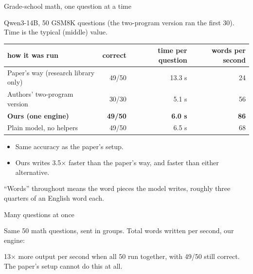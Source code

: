 \documentclass[aspectratio=169]{beamer}
\begin{document}
\begin{frame}{Grade-school math, one question at a time}

Qwen3-14B, 50 GSM8K questions (the two-program version ran the first 30). Time is the typical (middle) value.

\begin{center}
\begin{tabular}{lrrr}
\toprule
how it was run & correct & time per question & words per second \\
\midrule
Paper's way (research library only) & 49/50 & 13.3 s & 24 \\
Authors' two-program version & 30/30 & 5.1 s & 56 \\
\textbf{Ours (one engine)} & \textbf{49/50} & \textbf{6.0 s} & \textbf{86} \\
Plain model, no helpers & 49/50 & 6.5 s & 68 \\
\bottomrule
\end{tabular}
\end{center}

\begin{itemize}
  \item Same accuracy as the paper's setup.
  \item Ours writes 3.5$\times$ faster than the paper's way, and faster than either alternative.
\end{itemize}

{\footnotesize ``Words'' throughout means the word pieces the model writes, roughly three quarters of an English word each.}

\end{frame}

\begin{frame}{Many questions at once}

Same 50 math questions, sent in groups. Total words written per second, our engine:

\begin{center}
\end{center}

13$\times$ more output per second when all 50 run together, with 49/50 still correct.
The paper's setup cannot do this at all.

\end{frame}
\end{document}
